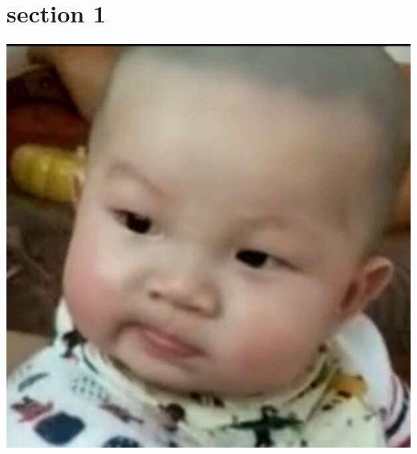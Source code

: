 \documentclass[12pt]{article}
\begin{document}
    \section{section 1}
    \includegraphics[bb=0 0 300 200]{baby.jpg}  %
\end{document}
